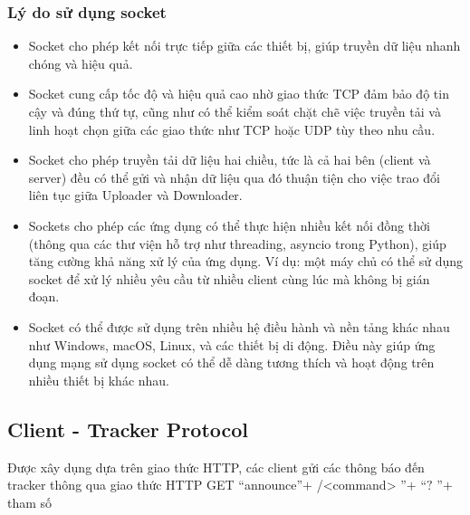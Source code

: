 \documentclass[a4paper]{article}
\begin{document}
        \subsubsection{Lý do sử dụng socket}
        \begin{itemize}
            \item Socket cho phép kết nối trực tiếp giữa các thiết bị, giúp truyền dữ liệu nhanh chóng và hiệu quả.
            \item Socket cung cấp tốc độ và hiệu quả cao nhờ giao thức TCP đảm bảo độ tin cậy và đúng thứ tự, cũng như có thể kiểm soát chặt chẽ việc truyền tải và linh hoạt chọn giữa các giao thức như TCP hoặc UDP tùy theo nhu cầu.
            \item Socket cho phép truyền tải dữ liệu hai chiều, tức là cả hai bên (client và server) đều có thể gửi và nhận dữ liệu qua đó thuận tiện cho việc trao đổi liên tục giữa Uploader và Downloader.
            \item Sockets cho phép các ứng dụng có thể thực hiện nhiều kết nối đồng thời (thông qua các thư viện hỗ trợ như threading, asyncio trong Python), giúp tăng cường khả năng xử lý của ứng dụng. Ví dụ: một máy chủ có thể sử dụng socket để xử lý nhiều yêu cầu từ nhiều client cùng lúc mà không bị gián đoạn.
            \item Socket có thể được sử dụng trên nhiều hệ điều hành và nền tảng khác nhau như Windows, macOS, Linux, và các thiết bị di động. Điều này giúp ứng dụng mạng sử dụng socket có thể dễ dàng tương thích và hoạt động trên nhiều thiết bị khác nhau.
        \end{itemize}

    \subsection{Client - Tracker Protocol}
    Được xây dụng dựa trên giao thức HTTP, các client gửi các thông báo đến tracker thông qua giao thức HTTP GET \textquotedblleft \/announce\textquotedblright $+$ /<command> \textquotedblright $+$ \textquotedblleft $?$ \textquotedblright $+$  tham số
\end{document}
